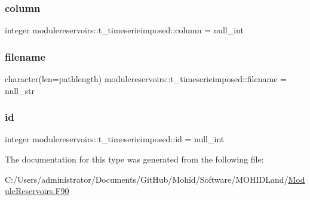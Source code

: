 \subsubsection{\texorpdfstring{column}{column}}
{\footnotesize\ttfamily integer modulereservoirs\+::t\+\_\+timeserieimposed\+::column = null\+\_\+int\hspace{0.3cm}{\ttfamily [private]}}

\mbox{\label{structmodulereservoirs_1_1t__timeserieimposed_a156743e54111b88e73da52154dfa66f5}} 
\subsubsection{\texorpdfstring{filename}{filename}}
{\footnotesize\ttfamily character(len=pathlength) modulereservoirs\+::t\+\_\+timeserieimposed\+::filename = null\+\_\+str\hspace{0.3cm}{\ttfamily [private]}}

\mbox{\label{structmodulereservoirs_1_1t__timeserieimposed_aa207f2819f335ad7b93216bf27bb96b1}} 
\subsubsection{\texorpdfstring{id}{id}}
{\footnotesize\ttfamily integer modulereservoirs\+::t\+\_\+timeserieimposed\+::id = null\+\_\+int\hspace{0.3cm}{\ttfamily [private]}}



The documentation for this type was generated from the following file\+:\begin{DoxyCompactItemize}
\item 
C\+:/\+Users/administrator/\+Documents/\+Git\+Hub/\+Mohid/\+Software/\+M\+O\+H\+I\+D\+Land/\mbox{\hyperlink{_module_reservoirs_8_f90}{Module\+Reservoirs.\+F90}}\end{DoxyCompactItemize}
